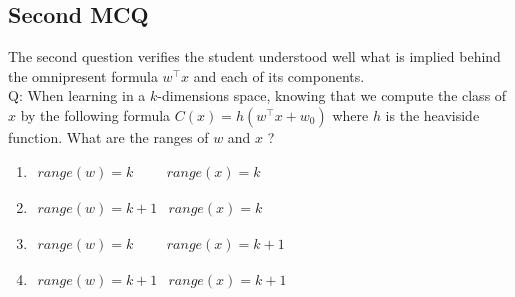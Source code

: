 \documentclass[a4paper, 10pt]{article}
\begin{document}
\subsection{Second MCQ}
The second question verifies the student understood well what is implied behind 
the omnipresent formula $w^\top x$ and each of its components.
\\
Q: When learning in a $k$-dimensions space, knowing that we compute the class of $x$
by the following formula $C(x) = h(w^\top x + w_0)$ where $h$ is the heaviside function. What are
the ranges of $w$ and $x$ ?
\begin{enumerate}
    \item $\begin{array}{cccc}range(w) = k & & & range(x) = k\end{array}$
    \item $\begin{array}{cc}range(w) = k+1 & range(x) = k\end{array}$
    \item $\begin{array}{cccc}range(w) = k & & & range(x) = k+1\end{array}$
    \item $\begin{array}{cc}range(w) = k+1 & range(x) = k+1\end{array}$
\end{enumerate}
\end{document}
